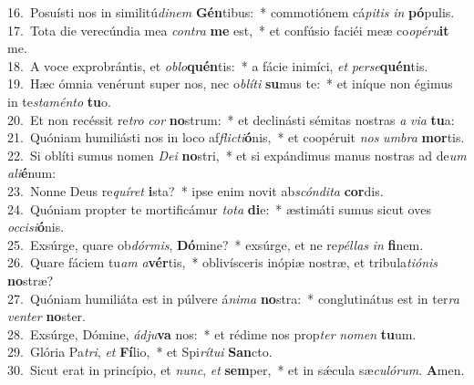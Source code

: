 {16.~}Posuísti nos in similitú\textit{di}\textit{nem} \textbf{Gén}tibus:~* commotiónem cá\textit{pi}\textit{tis} \textit{in} \textbf{pó}pulis.\\
{17.~}Tota die verecúndia mea \textit{con}\textit{tra} \textbf{me} est,~* et confúsio faciéi meæ co\textit{o}\textit{pé}\textit{ru}\textbf{it} me.\\
{18.~}A voce exprobrántis, et \textit{o}\textit{blo}\textbf{quén}tis:~* a fácie inimíci, \textit{et} \textit{per}\textit{se}\textbf{quén}tis.\\
{19.~}Hæc ómnia venérunt super nos, nec o\textit{blí}\textit{ti} \textbf{su}mus te:~* et iníque non égimus in te\textit{sta}\textit{mén}\textit{to} \textbf{tu}o.\\
{20.~}Et non recéssit re\textit{tro} \textit{cor} \textbf{no}strum:~* et declinásti sémitas nostras \textit{a} \textit{vi}\textit{a} \textbf{tu}a:\\
{21.~}Quóniam humiliásti nos in loco af\textit{fli}\textit{cti}\textbf{ó}nis,~* et coopéruit \textit{nos} \textit{um}\textit{bra} \textbf{mor}tis.\\
{22.~}Si oblíti sumus nomen \textit{De}\textit{i} \textbf{no}stri,~* et si expándimus manus nostras ad de\textit{um} \textit{a}\textit{li}\textbf{é}num:\\
{23.~}Nonne Deus re\textit{quí}\textit{ret} \textbf{i}sta?~* ipse enim novit ab\textit{scón}\textit{di}\textit{ta} \textbf{cor}dis.\\
{24.~}Quóniam propter te mortificámur \textit{to}\textit{ta} \textbf{di}e:~* æstimáti sumus sicut oves \textit{oc}\textit{ci}\textit{si}\textbf{ó}nis.\\
{25.~}Exsúrge, quare ob\textit{dór}\textit{mis}, \textbf{Dó}mine?~* exsúrge, et ne re\textit{pél}\textit{las} \textit{in} \textbf{fi}nem.\\
{26.~}Quare fáciem tu\textit{am} \textit{a}\textbf{vér}tis,~* oblivísceris inópiæ nostræ, et tribula\textit{ti}\textit{ó}\textit{nis} \textbf{no}stræ?\\
{27.~}Quóniam humiliáta est in púlvere á\textit{ni}\textit{ma} \textbf{no}stra:~* conglutinátus est in ter\textit{ra} \textit{ven}\textit{ter} \textbf{no}ster.\\
{28.~}Exsúrge, Dómine, \textit{ád}\textit{ju}\textbf{va} nos:~* et rédime nos prop\textit{ter} \textit{no}\textit{men} \textbf{tu}um.\\
{29.~}Glória Pa\textit{tri}, \textit{et} \textbf{Fí}lio,~* et Spi\textit{rí}\textit{tu}\textit{i} \textbf{San}cto.\\
{30.~}Sicut erat in princípio, et \textit{nunc}, \textit{et} \textbf{sem}per,~* et in sǽcula sæ\textit{cu}\textit{ló}\textit{rum}. \textbf{A}men.\\

